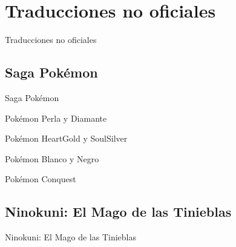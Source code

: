 
\section[Fan-traducciones]{Traducciones no oficiales}
\begin{frame}{Traducciones no oficiales}

\end{frame}

\subsection{Saga Pokémon}
\begin{frame}{Saga Pokémon}

\end{frame}

\begin{frame}{Pokémon Perla y Diamante}

\end{frame}

\begin{frame}{Pokémon HeartGold y SoulSilver}

\end{frame}

\begin{frame}{Pokémon Blanco y Negro}

\end{frame}

\begin{frame}{Pokémon Conquest}

\end{frame}

\subsection{Ninokuni: El Mago de las Tinieblas}
\begin{frame}{Ninokuni: El Mago de las Tinieblas}

\end{frame}
